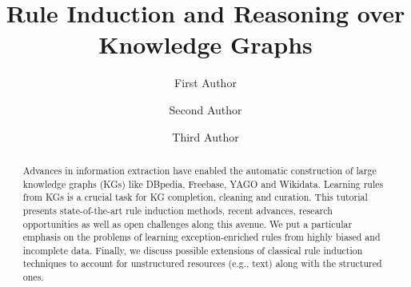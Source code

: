\documentclass[runningheads]{llncs}
\begin{document}
%
\title{Rule Induction and Reasoning over Knowledge Graphs}
%
%
\author{First Author \and
Second Author \and
Third Author}


%
%
%
\maketitle              %
%
\begin{abstract}
Advances in information extraction have enabled the automatic
construction of large knowledge graphs (KGs) like DBpedia, Freebase, YAGO
and Wikidata. Learning rules from KGs is a crucial task for KG completion,
cleaning and curation. This tutorial presents state-of-the-art rule
induction methods, recent advances, research opportunities as well as open
challenges along this avenue. We put a particular emphasis on the problems
of learning exception-enriched rules from highly biased and incomplete
data. Finally, we discuss possible extensions of classical rule induction
techniques to account for unstructured resources (e.g., text) along with
the structured ones.
\end{abstract}






%






%
%
 
 
%
\end{document}
